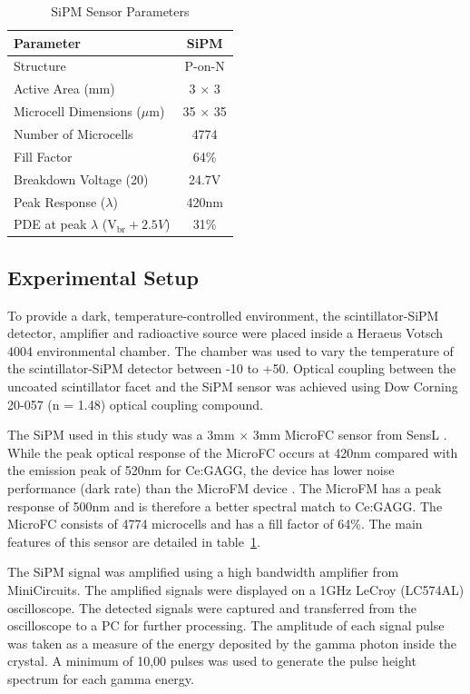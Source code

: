 \documentclass[journal]{IEEEtran}
\begin{document}
\begin{table}[t] %
\renewcommand{\arraystretch}{1.2}
\caption{SiPM Sensor Parameters}
\label{tab:spm_param}
\centering
\begin{tabular}{l | c }
\hline
\bfseries Parameter &  \bfseries SiPM\\
\hline \hline
Structure & P-on-N\\
Active Area (mm) & 3 $\times$ 3\\
Microcell Dimensions ($\mu$m) & 35 $\times$ 35\\
Number of Microcells & 4774\\
Fill Factor & 64\%\\
Breakdown Voltage (20\celsius{}) & 24.7V\\
Peak Response ($\lambda$) & 420nm\\ 
PDE at peak $\lambda$ (V$_{\text{br}}+2.5V$) & 31\%\\
\hline
\end{tabular}
\end{table}


%
\subsection{Experimental Setup}

To provide a dark, temperature-controlled environment, the scintillator-SiPM detector, amplifier and radioactive source were placed inside a Heraeus Votsch 4004 environmental chamber. The chamber was used to vary the temperature of the scintillator-SiPM detector between -10 to +50\celsius{}. Optical coupling between the uncoated scintillator facet and the SiPM sensor was achieved using Dow Corning 20-057 (n = 1.48) optical coupling compound. 

The SiPM used in this study was a 3mm $\times$ 3mm MicroFC sensor from SensL \cite{sensl:oneill2}. While the peak optical response of the MicroFC occurs at 420nm compared with the emission peak of 520nm for Ce:GAGG, the device has lower noise performance (dark rate) than the MicroFM device \cite{stewart:microFC}. The MicroFM has a peak response of 500nm and is therefore a better spectral match to Ce:GAGG. The MicroFC consists of 4774 microcells and has a fill factor of 64\%. The main features of this sensor are detailed in table~\ref{tab:spm_param}.  

The SiPM signal was amplified using a high bandwidth amplifier from MiniCircuits. The amplified signals were displayed on a 1GHz LeCroy (LC574AL) oscilloscope. The detected signals were captured and transferred from the oscilloscope to a PC for further processing. The amplitude of each signal pulse was taken as a measure of the energy deposited by the gamma photon inside the crystal. A minimum of 10,00 pulses was used to generate the pulse height spectrum for each gamma energy.  
%
%
\end{document}
